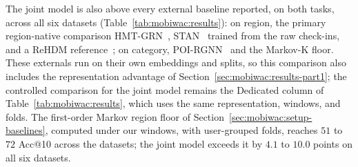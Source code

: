 The joint model is also above every external baseline reported, on both tasks,
across all six datasets (Table~\ref{tab:mobiwac:results}): on region, the primary
region-native comparison HMT-GRN~\cite{Lim2022}, STAN~\cite{luo2021stan}
trained from the raw check-ins, and a ReHDM reference~\cite{li2025rehdm}; on
category, POI-RGNN~\cite{capanema2023poirgnn} and the Markov-K floor. These externals run on their own embeddings and splits, so this comparison also includes the representation advantage of Section~\ref{sec:mobiwac:results-part1}; the
controlled comparison for the joint model remains the Dedicated column of
Table~\ref{tab:mobiwac:results}, which uses the same representation, windows, and
folds. The first-order Markov region floor of Section~\ref{sec:mobiwac:setup-baselines},
computed under our windows, with user-grouped folds, reaches $51$ to $72$ Acc@10 across the
datasets; the joint model exceeds it by $4.1$ to $10.0$ points on all six
datasets.

